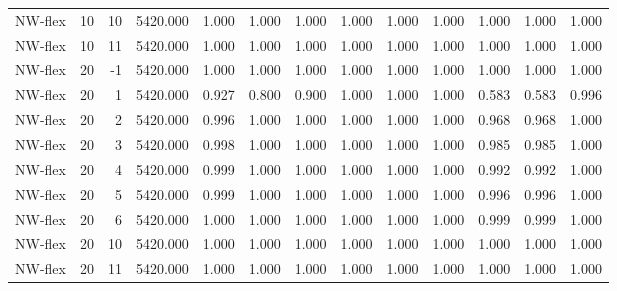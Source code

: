 \begin{table}
\begin{tabular}{lrrrrrrrrrrrr}
NW-flex & 10 & 10 & 5420.000 & 1.000 & 1.000 & 1.000 & 1.000 & 1.000 & 1.000 & 1.000 & 1.000 & 1.000 \\
NW-flex & 10 & 11 & 5420.000 & 1.000 & 1.000 & 1.000 & 1.000 & 1.000 & 1.000 & 1.000 & 1.000 & 1.000 \\
NW-flex & 20 & -1 & 5420.000 & 1.000 & 1.000 & 1.000 & 1.000 & 1.000 & 1.000 & 1.000 & 1.000 & 1.000 \\
NW-flex & 20 & 1 & 5420.000 & 0.927 & 0.800 & 0.900 & 1.000 & 1.000 & 1.000 & 0.583 & 0.583 & 0.996 \\
NW-flex & 20 & 2 & 5420.000 & 0.996 & 1.000 & 1.000 & 1.000 & 1.000 & 1.000 & 0.968 & 0.968 & 1.000 \\
NW-flex & 20 & 3 & 5420.000 & 0.998 & 1.000 & 1.000 & 1.000 & 1.000 & 1.000 & 0.985 & 0.985 & 1.000 \\
NW-flex & 20 & 4 & 5420.000 & 0.999 & 1.000 & 1.000 & 1.000 & 1.000 & 1.000 & 0.992 & 0.992 & 1.000 \\
NW-flex & 20 & 5 & 5420.000 & 0.999 & 1.000 & 1.000 & 1.000 & 1.000 & 1.000 & 0.996 & 0.996 & 1.000 \\
NW-flex & 20 & 6 & 5420.000 & 1.000 & 1.000 & 1.000 & 1.000 & 1.000 & 1.000 & 0.999 & 0.999 & 1.000 \\
NW-flex & 20 & 10 & 5420.000 & 1.000 & 1.000 & 1.000 & 1.000 & 1.000 & 1.000 & 1.000 & 1.000 & 1.000 \\
NW-flex & 20 & 11 & 5420.000 & 1.000 & 1.000 & 1.000 & 1.000 & 1.000 & 1.000 & 1.000 & 1.000 & 1.000 \\
\bottomrule
\end{tabular}
\end{table}
